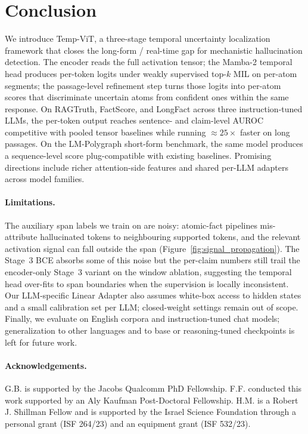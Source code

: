 \section{Conclusion}

We introduce Temp-ViT, a three-stage temporal uncertainty localization
framework that closes the long-form / real-time gap for mechanistic
hallucination detection. The encoder reads the full activation tensor;
the Mamba-2 temporal head produces per-token logits under weakly
supervised top-$k$ MIL on per-atom segments; the passage-level
refinement step turns those logits into per-atom scores that
discriminate uncertain atoms from confident ones within the same
response. On RAGTruth, FactScore, and LongFact across three
instruction-tuned LLMs, the per-token output reaches sentence- and
claim-level AUROC competitive with pooled tensor baselines while
running $\approx 25\times$ faster on long passages. On the
LM-Polygraph short-form benchmark, the same model produces a
sequence-level score plug-compatible with existing baselines. Promising
directions include richer attention-side features and shared per-LLM
adapters across model families.

\paragraph{Limitations.} The auxiliary span labels we train on are
noisy: atomic-fact pipelines mis-attribute hallucinated tokens to
neighbouring supported tokens, and the relevant activation signal can
fall outside the span (Figure~\ref{fig:signal_propagation}). The
Stage~3 BCE absorbs some of this noise but the per-claim numbers
still trail the encoder-only Stage~3 variant on the window ablation,
suggesting the temporal head over-fits to span boundaries when the
supervision is locally inconsistent. Our LLM-specific Linear Adapter
also assumes white-box access to hidden states and a small calibration
set per LLM; closed-weight settings remain out of scope. Finally, we
evaluate on English corpora and instruction-tuned chat models;
generalization to other languages and to base or reasoning-tuned
checkpoints is left for future work.

\paragraph{Acknowledgements.} G.B. is supported by the Jacobs Qualcomm
PhD Fellowship. F.F. conducted this work supported by an Aly Kaufman
Post-Doctoral Fellowship. H.M. is a Robert J. Shillman Fellow and is
supported by the Israel Science Foundation through a personal grant
(ISF 264/23) and an equipment grant (ISF 532/23).
